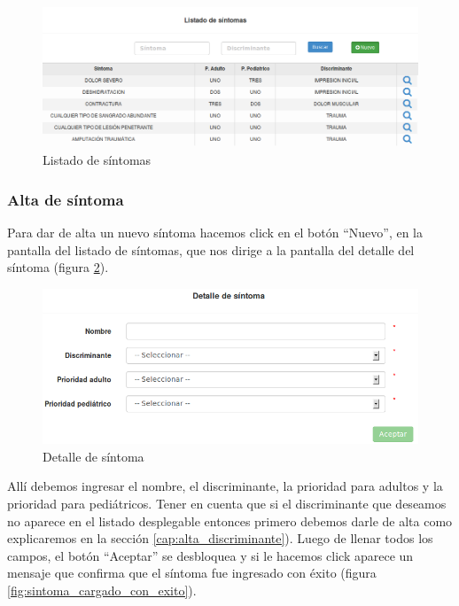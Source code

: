 \begin{figure}
\centerline{\includegraphics[width=1\textwidth]{listado_sintomas.png}}
\caption{Listado de síntomas}
\label{fig:listado_sintomas}
\end{figure}

\subsubsection{Alta de síntoma}\label{cap:alta_sintoma}
Para dar de alta un nuevo síntoma hacemos click en el botón ``Nuevo'', en la pantalla del listado de síntomas, que nos dirige a la pantalla del detalle del síntoma (figura \ref{fig:detalle_sintoma}).
\begin{figure}
\centerline{\includegraphics[width=1\textwidth]{detalle_sintoma.png}}
\caption{Detalle de síntoma}
\label{fig:detalle_sintoma}
\end{figure}
Allí debemos ingresar el nombre, el discriminante, la prioridad para adultos y la prioridad para pediátricos. Tener en cuenta que si el discriminante que deseamos no aparece en el listado desplegable entonces primero debemos darle de alta como explicaremos en la sección \ref{cap:alta_discriminante}). Luego de llenar todos los campos, el botón ``Aceptar'' se desbloquea y si le hacemos click aparece un mensaje que confirma que el síntoma fue ingresado con éxito (figura \ref{fig:sintoma_cargado_con_exito}).
